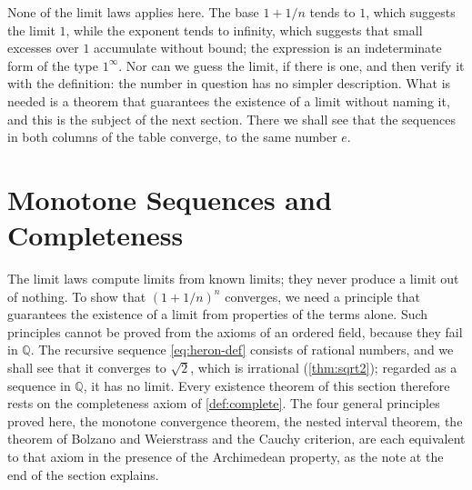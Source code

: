 \begin{table}
\end{table}

None of the limit laws applies here. The base $1+1/n$ tends to $1$, which suggests the limit $1$, while the exponent tends to infinity, which suggests that small excesses over $1$ accumulate without bound; the expression is an indeterminate form of the type $1^\infty$. Nor can we guess the limit, if there is one, and then verify it with the definition: the number in question has no simpler description. What is needed is a theorem that guarantees the existence of a limit without naming it, and this is the subject of the next section. There we shall see that the sequences in both columns of the table converge, to the same number $e$.

\section{Monotone Sequences and Completeness}
\label{sec:completeness}

The limit laws compute limits from known limits; they never produce a limit out of nothing. To show that $(1+1/n)^n$ converges, we need a principle that guarantees the existence of a limit from properties of the terms alone. Such principles cannot be proved from the axioms of an ordered field, because they fail in $\mathbb Q$. The recursive sequence \eqref{eq:heron-def} consists of rational numbers, and we shall see that it converges to $\sqrt2$, which is irrational (\cref{thm:sqrt2}); regarded as a sequence in $\mathbb Q$, it has no limit. Every existence theorem of this section therefore rests on the completeness axiom of \cref{def:complete}. The four general principles proved here, the monotone convergence theorem, the nested interval theorem, the theorem of Bolzano and Weierstrass and the Cauchy criterion, are each equivalent to that axiom in the presence of the Archimedean property, as the note at the end of the section explains.

